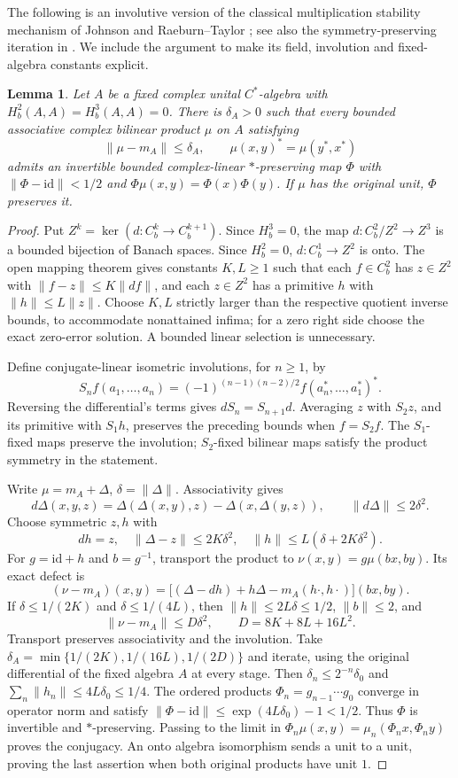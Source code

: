 \documentclass[11pt]{article}
\newtheorem{lemma}[theorem]{Lemma}
\newcommand{\Cb}{C_b}
\newcommand{\Hb}{H_b}
\newcommand{\id}{\mathrm{id}}
\begin{document}
The following is an involutive version of the classical multiplication
stability mechanism of Johnson and Raeburn--Taylor
\cite{Johnson,RaeburnTaylor}; see also the symmetry-preserving iteration
in \cite[Proposition 3.2]{RicardRoydor}. We include the argument to make
its field, involution and fixed-algebra constants explicit.
\begin{lemma}\label{lem:deform}
Let $A$ be a fixed complex unital $C^*$-algebra with
$\Hb^2(A,A)=\Hb^3(A,A)=0$. There is $\delta_A>0$ such that every bounded
associative complex bilinear product $\mu$ on $A$ satisfying
\[
 \|\mu-m_A\|\le\delta_A,
 \qquad \mu(x,y)^*=\mu(y^*,x^*)
\]
admits an invertible bounded complex-linear $*$-preserving map $\Phi$
with $\|\Phi-\id\|<1/2$ and
$\Phi\mu(x,y)=\Phi(x)\Phi(y)$. If $\mu$ has the original unit, $\Phi$
preserves it.
\end{lemma}
\begin{proof}
Put $Z^k=\ker(d:\Cb^k\to\Cb^{k+1})$. Since $\Hb^3=0$, the map
$d:\Cb^2/Z^2\to Z^3$ is a bounded bijection of Banach spaces. Since
$\Hb^2=0$, $d:\Cb^1\to Z^2$ is onto. The open mapping theorem gives
constants $K,L\ge1$ such that each $f\in\Cb^2$ has $z\in Z^2$ with
$\|f-z\|\le K\|df\|$, and each $z\in Z^2$ has a primitive $h$ with
$\|h\|\le L\|z\|$. Choose $K,L$ strictly larger than the respective
quotient inverse bounds, to accommodate nonattained infima; for a zero
right side choose the exact zero-error solution. A bounded linear
selection is unnecessary.

Define conjugate-linear isometric involutions, for $n\ge1$, by
\[
 S_n f(a_1,\ldots,a_n)
 =(-1)^{(n-1)(n-2)/2}f(a_n^*,\ldots,a_1^*)^*.
\]
Reversing the differential's terms gives $dS_n=S_{n+1}d$. Averaging
$z$ with $S_2z$, and its primitive with $S_1h$, preserves the preceding
bounds when $f=S_2f$. The $S_1$-fixed maps preserve the involution;
$S_2$-fixed bilinear maps satisfy the product symmetry in the statement.

Write $\mu=m_A+\Delta$, $\delta=\|\Delta\|$. Associativity gives
\[
 d\Delta(x,y,z)=\Delta(\Delta(x,y),z)-\Delta(x,\Delta(y,z)),
 \qquad \|d\Delta\|\le2\delta^2.
\]
Choose symmetric $z,h$ with
\[
 dh=z,\quad \|\Delta-z\|\le2K\delta^2,\quad
 \|h\|\le L(\delta+2K\delta^2).
\]
For $g=\id+h$ and $b=g^{-1}$, transport the product to
$\nu(x,y)=g\mu(bx,by)$. Its exact defect is
\[
 (\nu-m_A)(x,y)
 =\bigl[(\Delta-dh)+h\Delta-m_A(h\cdot,h\cdot)\bigr](bx,by).
\]
If $\delta\le1/(2K)$ and $\delta\le1/(4L)$, then
$\|h\|\le2L\delta\le1/2$, $\|b\|\le2$, and
\[
 \|\nu-m_A\|\le D\delta^2,
 \qquad D=8K+8L+16L^2.
\]
Transport preserves associativity and the involution. Take
$\delta_A=\min\{1/(2K),1/(16L),1/(2D)\}$ and iterate, using the
original differential of the fixed algebra $A$ at every stage.
Then $\delta_n\le2^{-n}\delta_0$ and
$\sum_n\|h_n\|\le4L\delta_0\le1/4$.
The ordered products $\Phi_n=g_{n-1}\cdots g_0$ converge in operator
norm and satisfy
$\|\Phi-\id\|\le\exp(4L\delta_0)-1<1/2$.
Thus $\Phi$ is invertible and $*$-preserving. Passing to the limit in
$\Phi_n\mu(x,y)=\mu_n(\Phi_nx,\Phi_ny)$ proves the conjugacy.
An onto algebra isomorphism sends a unit to a unit, proving the last
assertion when both original products have unit $1$.
\end{proof}
\end{document}
